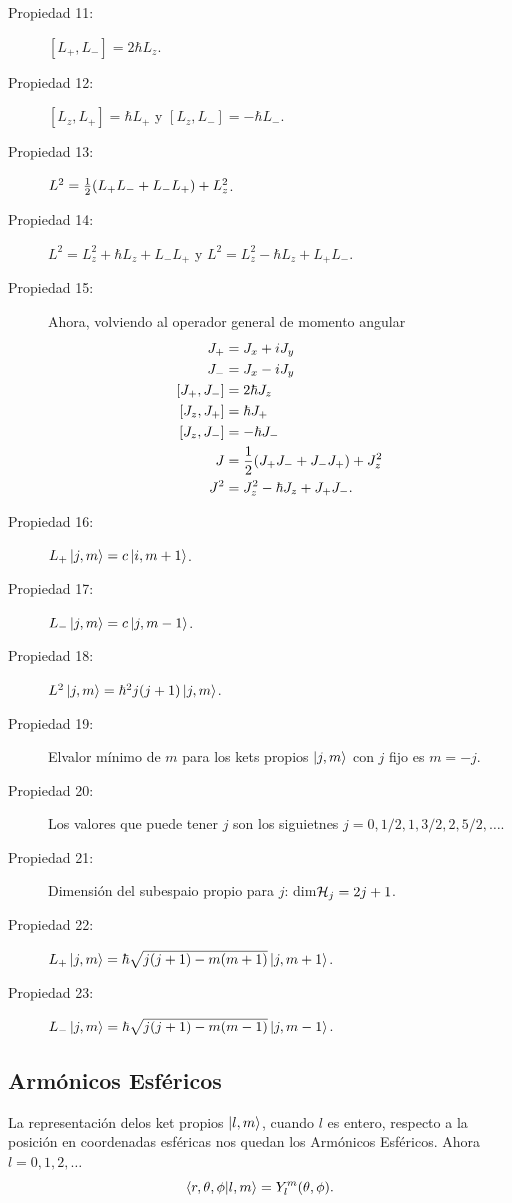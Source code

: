 \begin{description}
	\item[Propiedad 11: ] $[L_+ ,L_-] = 2\hbar L_z$.
	\item[Propiedad 12: ] $[L_z ,L_+] = \hbar L_+$ y $[L_z ,L_-] = -\hbar L_-$.
	\item[Propiedad 13: ] $L^2 = \frac{1}{2} \qty(L_+ L_- + L_- L_+) + L_z ^2$.
	\item[Propiedad 14: ] $L^2 = L_z ^2 + \hbar L_z + L_- L_+$ y $L^2 = L_z ^2 - \hbar L_z + L_+ L_-$.
	\item[Propiedad 15: ] Ahora, volviendo al operador general de momento angular
		\begin{align*}
			J_+ &= J_x + iJ_y \\
			J_- &= J_x - iJ_y \\
			[J_+ ,J_-] &= 2\hbar J_z \\
			[J_z ,J_+] &= \hbar J_+ \\
			[J_z ,J_-] &= -\hbar J_- \\
			J &= \frac{1}{2} \qty(J_+ J_- + J_- J_+) + J_z ^2 \\
			J^2 &= J_z ^2 - \hbar J_z + J_+ J_-.
		\end{align*}
	\item[Propiedad 16: ] $L_+ \ket{j,m} = c\ket{i,m+1}$.
	\item[Propiedad 17: ] $L_- \ket{j,m} = c\ket{j,m-1}$.
	\item[Propiedad 18: ] $L^2 \ket{j,m} = \hbar ^2 j(j + 1) \ket{j,m}$.
	\item[Propiedad 19: ] Elvalor mínimo de $m$ para los kets propios $\ket{j,m}$ con $j$ fijo es $m=-j$.
	\item[Propiedad 20: ] Los valores que puede tener $j$ son los siguietnes $j = 0, 1/2, 1, 3/2, 2, 5/2, \ldots$.
	\item[Propiedad 21: ] Dimensión del subespaio propio para $j$: dim$\mathcal{H} _j = 2j+1$.
	\item[Propiedad 22: ] $L_+ \ket{j,m} = \hbar \sqrt{j(j+1) - m(m + 1)} \ket{j,m + 1}$.
	\item[Propiedad 23: ] $L_- \ket{j,m} = \hbar \sqrt{j(j+1) - m(m - 1)} \ket{j,m - 1}$.
\end{description}


\subsection{Armónicos Esféricos}
La representación delos ket propios $\ket{l,m}$, cuando $l$ es entero, respecto a la posición en coordenadas esféricas nos quedan los Armónicos Esféricos. Ahora $l=0,1,2,\ldots$
	\begin{equation}
		\braket{r,\theta ,\phi}{l,m} = Y_l ^m (\theta ,\phi).
	\end{equation}





